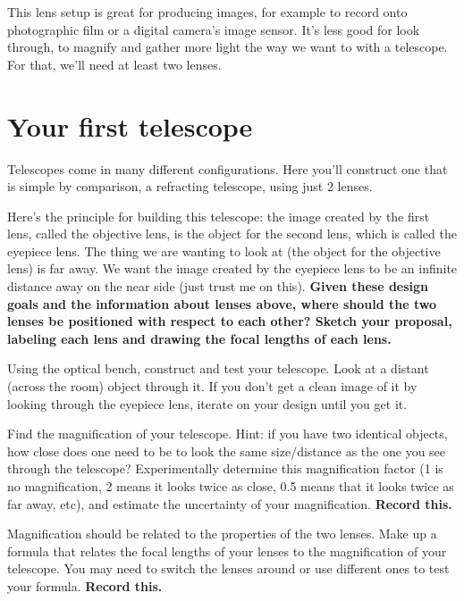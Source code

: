 This lens setup is great for producing images, for example to record onto photographic film or a digital camera's image sensor. It's less good for look through, to magnify and gather more light the way we want to with a telescope. For that, we'll need at least two lenses.

\section{Your first telescope}

Telescopes come in many different configurations. Here you'll construct one that is simple by comparison, a refracting telescope, using just 2 lenses.

\begin{steps}
	\item Here's the principle for building this telescope: the image created by the first lens, called the objective lens, is the object for the second lens, which is called the eyepiece lens. The thing we are wanting to look at (the object for the objective lens) is far away. We want the image created by the eyepiece lens to be an infinite distance away on the near side (just trust me on this). \textbf{Given these design goals and the information about lenses above, where should the two lenses be positioned with respect to each other? Sketch your proposal, labeling each lens and drawing the focal lengths of each lens.}
	
	\item Using the optical bench, construct and test your telescope. Look at a distant (across the room) object through it. If you don't get a clean image of it by looking through the eyepiece lens, iterate on your design until you get it.
	
	\item Find the magnification of your telescope. Hint: if you have two identical objects, how close does one need to be to look the same size/distance as the one you see through the telescope? Experimentally determine this magnification factor (1 is no magnification, 2 means it looks twice as close, 0.5 means that it looks twice as far away, etc), and estimate the uncertainty of your magnification. \textbf{Record this.}
	
	\item Magnification should be related to the properties of the two lenses. Make up a formula that relates the focal lengths of your lenses to the magnification of your telescope. You may need to switch the lenses around or use different ones to test your formula. \textbf{Record this.}
\end{steps}

